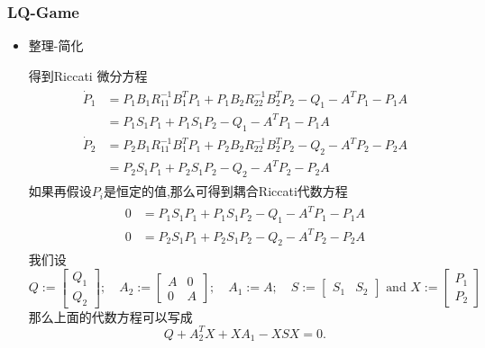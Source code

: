 \documentclass[UTF8, aspectratio=169, 9pt]{ctexbeamer}
\begin{document}
\begin{frame}
\frametitle{LQ-Game}
\begin{itemize}
\item 整理-简化

得到Riccati 微分方程
\begin{align*}
  \begin{split}
     \dot{P}_1 & =   P_1 B_1 R^{-1}_{11} B^T_1 P_1  + P_1 B_2 R^{-1}_{22} B^T_2 P_2  - Q_1 - A^T P_1 - P_1 A \\
     & = P_1 S_1 P_1 + P_1 S_1 P_2 - Q_1 - A^T P_1 - P_1 A\\
     \dot{P}_2 & = P_2 B_1 R^{-1}_{11} B^T_1 P_1  + P_2 B_2 R^{-1}_{22} B^T_2 P_2  - Q_2 - A^T P_2 - P_2 A \\
     & = P_2 S_1 P_1 + P_2 S_1 P_2 - Q_2 - A^T P_2 - P_2 A
  \end{split}
\end{align*}
如果再假设$P_i$是恒定的值,那么可得到耦合Riccati代数方程
\begin{align*}
  \begin{split}
     0 & =  P_1 S_1 P_1 + P_1 S_1 P_2 - Q_1 - A^T P_1 - P_1 A\\
     0 & = P_2 S_1 P_1 + P_2 S_1 P_2 - Q_2 - A^T P_2 - P_2 A
  \end{split}
\end{align*}
我们设
$$
Q:=\left[\begin{array}{l}
Q_{1} \\
Q_{2}
\end{array}\right] ; \quad A_{2}:=\left[\begin{array}{ll}
A & 0 \\
0 & A
\end{array}\right] ; \quad A_{1}:=A ; \quad S:=\left[\begin{array}{ll}
S_{1} & S_{2}
\end{array}\right] \text { and } X:=\left[\begin{array}{l}
P_{1} \\
P_{2}
\end{array}\right]
$$
那么上面的代数方程可以写成
$$
Q + A^T_2 X + X A_1 - XSX = 0.
$$
\end{itemize}
\end{frame}
\end{document}
